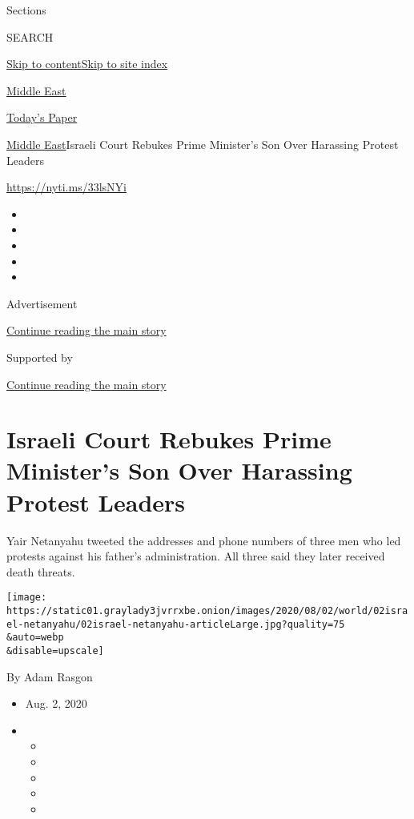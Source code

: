 Sections

SEARCH

\protect\hyperlink{site-content}{Skip to
content}\protect\hyperlink{site-index}{Skip to site index}

\href{https://www.nytimes3xbfgragh.onion/section/world/middleeast}{Middle
East}

\href{https://myaccount.nytimes3xbfgragh.onion/auth/login?response_type=cookie\&client_id=vi}{}

\href{https://www.nytimes3xbfgragh.onion/section/todayspaper}{Today's
Paper}

\href{/section/world/middleeast}{Middle East}\textbar{}Israeli Court
Rebukes Prime Minister's Son Over Harassing Protest Leaders

\url{https://nyti.ms/33lsNYi}

\begin{itemize}
\item
\item
\item
\item
\item
\end{itemize}

Advertisement

\protect\hyperlink{after-top}{Continue reading the main story}

Supported by

\protect\hyperlink{after-sponsor}{Continue reading the main story}

\hypertarget{israeli-court-rebukes-prime-ministers-son-over-harassing-protest-leaders}{%
\section{Israeli Court Rebukes Prime Minister's Son Over Harassing
Protest
Leaders}\label{israeli-court-rebukes-prime-ministers-son-over-harassing-protest-leaders}}

Yair Netanyahu tweeted the addresses and phone numbers of three men who
led protests against his father's administration. All three said they
later received death threats.

\texttt{[image: https://static01.graylady3jvrrxbe.onion/images/2020/08/02/world/02israel-netanyahu/02israel-netanyahu-articleLarge.jpg?quality=75\\\&auto=webp\\\&disable=upscale]}

By Adam Rasgon

\begin{itemize}
\item
  Aug. 2, 2020
\item
  \begin{itemize}
  \item
  \item
  \item
  \item
  \item
  \end{itemize}
\end{itemize}

